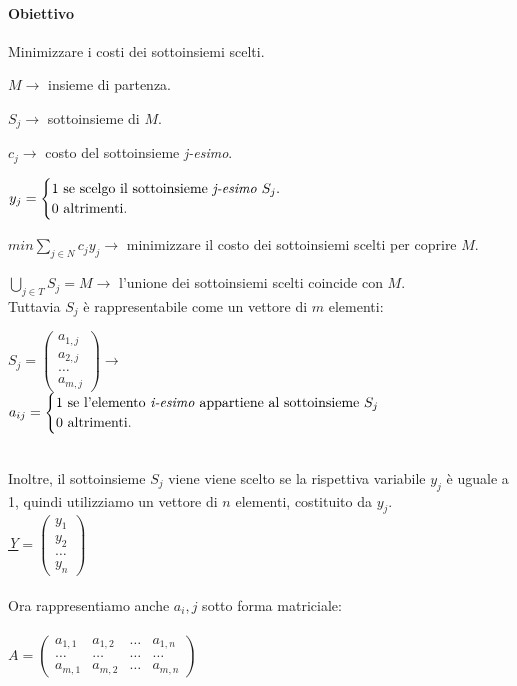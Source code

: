 \documentclass[12pt, twoside, letterpaper]{article}
\newcommand{\casi}[3]{
	$#1 = \begin{cases} \text{#2} \\ \text{#3} \end{cases}$
}
\begin{document}
{				\paragraph{Obiettivo} Minimizzare i costi dei sottoinsiemi scelti.
			}{
				\item $M \rightarrow$ insieme di partenza.
				\item $S_j \rightarrow$ sottoinsieme di $M$.
				\item $c_j \rightarrow$ costo del sottoinsieme \textit{j-esimo}.
			}{
				\item \casi{y_j}{1 se scelgo il sottoinsieme \textit{j-esimo} $S_j$.}{0 altrimenti.}
			}{
				\item $min \sum_{j \in N} c_j y_j \rightarrow$ minimizzare il costo dei  sottoinsiemi scelti per coprire $M$.
			}{
				\item $\bigcup_{j \in T} S_j = M \rightarrow$ l'unione dei sottoinsiemi scelti coincide con $M$.\\
				Tuttavia $S_j$ è rappresentabile come un vettore di $m$ elementi:
				\item $S_j = \begin{pmatrix}
					a_{1,j} \\
					a_{2,j} \\
					\dots \\
					a_{m,j}
				\end{pmatrix} \rightarrow$ \casi{a_{ij}}{1 se l'elemento \textit{i-esimo} appartiene al sottoinsieme $S_j$}{0 altrimenti.}
				\\Inoltre, il sottoinsieme $S_j$ viene viene scelto se la rispettiva variabile $y_j$ è uguale a 1, quindi utilizziamo un vettore di $n$ elementi, costituito da $y_j$.\\
				\underline{\textit{Y}}$ = \begin{pmatrix}
					y_1 \\
					y_2 \\
					\dots \\
					y_n
				\end{pmatrix}$ 
				\\\\Ora rappresentiamo anche $a_i,j$ sotto forma matriciale:\\\\
				$A = \begin{pmatrix}
					a_{1,1} & a_{1,2} & \dots & a_{1,n} \\
					\dots & \dots & \dots & \dots \\
					a_{m,1} & a_{m,2} & \dots & a_{m,n}
				\end{pmatrix}$\\\\
}
\end{document}

